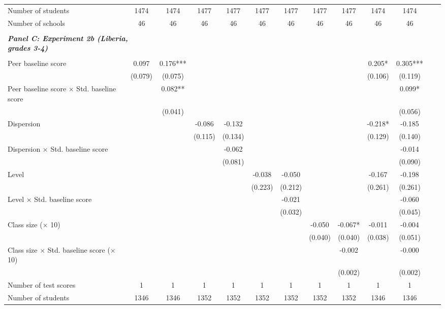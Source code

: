 \begin{center}
\begin{tiny}
\begin{threeparttable}
\begin{tabular} {@{} l l c c c c c c c c c c c c @{}}
Number of students &  & 1474 & 1474 & 1477 & 1477 & 1477 & 1477 & 1477 & 1477 & 1474 & 1474 \\
Number of schools &  & 46 & 46 & 46 & 46 & 46 & 46 & 46 & 46 & 46 & 46 \\
 \midrule
\\
\multicolumn{3}{l}{\textbf{\textit{Panel C: Experiment 2b (Liberia, grades 3-4)}}} \\
\\
Peer baseline score &  & 0.097 & 0.176*** &  &  &  &  &  &  & 0.205* & 0.305*** \\
                 &  & (0.079) & (0.075) &  &  &  &  &  &  & (0.106) & (0.119) \\
Peer baseline score $\times$ Std. baseline score &  &  & 0.082** &  &  &  &  &  &  &  & 0.099* \\
                 &  &  & (0.041) &  &  &  &  &  &  &  & (0.056) \\
Dispersion &  &  &  & -0.086 & -0.132 &  &  &  &  & -0.218* & -0.185 \\
                 &  &  &  & (0.115) & (0.134) &  &  &  &  & (0.129) & (0.140) \\
Dispersion $\times$ Std. baseline score &  &  &  &  & -0.062 &  &  &  &  &  & -0.014 \\
                 &  &  &  &  & (0.081) &  &  &  &  &  & (0.090) \\
Level &  &  &  &  &  & -0.038 & -0.050 &  &  & -0.167 & -0.198 \\
                 &  &  &  &  &  & (0.223) & (0.212) &  &  & (0.261) & (0.261) \\
Level $\times$ Std. baseline score &  &  &  &  &  &  & -0.021 &  &  &  & -0.060 \\
                 &  &  &  &  &  &  & (0.032) &  &  &  & (0.045) \\
Class size ($\times$ 10) &  &  &  &  &  &  &  & -0.050 & -0.067* & -0.011 & -0.004 \\
                 &  &  &  &  &  &  &  & (0.040) & (0.040) & (0.038) & (0.051) \\
Class size $\times$ Std. baseline score ($\times$ 10) &  &  &  &  &  &  &  &  & -0.002 &  & -0.000 \\
                 &  &  &  &  &  &  &  &  & (0.002) &  & (0.002) \\
\midrule
Number of test scores &  & 1 & 1 & 1 & 1 & 1 & 1 & 1 & 1 & 1 & 1 \\
Number of students &  & 1346 & 1346 & 1352 & 1352 & 1352 & 1352 & 1352 & 1352 & 1346 & 1346 \\

\end{tabular}
\end{threeparttable}
\end{tiny}
\end{center}

